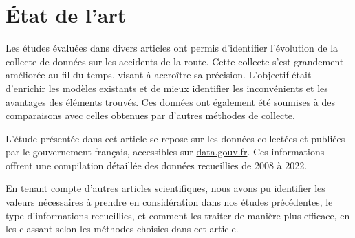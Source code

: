\documentclass[french]{article}
\begin{document}
\section{État de l'art}
Les études évaluées dans divers articles ont permis d’identifier l’évolution de la collecte de données sur les accidents de la route. Cette collecte s'est grandement améliorée au fil du temps, visant à accroître sa précision. L’objectif était d’enrichir les modèles existants et de mieux identifier les inconvénients et les avantages des éléments trouvés. Ces données ont également été soumises à des comparaisons avec celles obtenues par d’autres méthodes de collecte.

L’étude présentée dans cet article se repose sur les données collectées et publiées par le gouvernement français, accessibles sur \href{http://data.gouv.fr/}{data.gouv.fr}. Ces informations offrent une compilation détaillée des données recueillies de 2008 à 2022.

En tenant compte d’autres articles scientifiques, nous avons pu identifier les valeurs nécessaires à prendre en considération dans nos études précédentes, le type d’informations recueillies, et comment les traiter de manière plus efficace, en les classant selon les méthodes choisies dans cet article.
\end{document}
